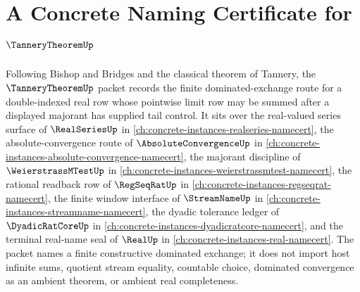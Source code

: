 \chapter{A Concrete Naming Certificate for $\TanneryTheoremUp$}
\label{ch:concrete-instances-tannery-theorem-namecert}

Following Bishop and Bridges and the classical theorem of Tannery, the $\TanneryTheoremUp$ packet records the finite dominated-exchange route for a double-indexed real row whose pointwise limit row may be summed after a displayed majorant has supplied tail control. It sits over the real-valued series surface of $\RealSeriesUp$ in \autoref{ch:concrete-instances-realseries-namecert}, the absolute-convergence route of $\AbsoluteConvergenceUp$ in \autoref{ch:concrete-instances-absolute-convergence-namecert}, the majorant discipline of $\WeierstrassMTestUp$ in \autoref{ch:concrete-instances-weierstrassmtest-namecert}, the rational readback row of $\RegSeqRatUp$ in \autoref{ch:concrete-instances-regseqrat-namecert}, the finite window interface of $\StreamNameUp$ in \autoref{ch:concrete-instances-streamname-namecert}, the dyadic tolerance ledger of $\DyadicRatCoreUp$ in \autoref{ch:concrete-instances-dyadicratcore-namecert}, and the terminal real-name seal of $\RealUp$ in \autoref{ch:concrete-instances-real-namecert}. The packet names a finite constructive dominated exchange; it does not import host infinite sums, quotient stream equality, countable choice, dominated convergence as an ambient theorem, or ambient real completeness.

